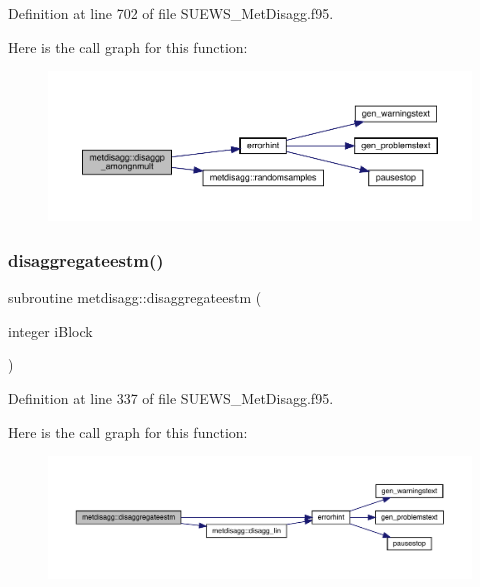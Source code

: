 Definition at line 702 of file S\+U\+E\+W\+S\+\_\+\+Met\+Disagg.\+f95.

Here is the call graph for this function\+:\nopagebreak
\begin{figure}[H]
\begin{center}
\leavevmode
\includegraphics[width=350pt]{namespacemetdisagg_aba0eed0257bc8f0ce67fac76eae7375b_cgraph}
\end{center}
\end{figure}
\mbox{\label{namespacemetdisagg_a67b638fd95044f06d411c6866ea8b2be}} 
\subsubsection{\texorpdfstring{disaggregateestm()}{disaggregateestm()}}
{\footnotesize\ttfamily subroutine metdisagg\+::disaggregateestm (\begin{DoxyParamCaption}\item[{integer}]{i\+Block }\end{DoxyParamCaption})}



Definition at line 337 of file S\+U\+E\+W\+S\+\_\+\+Met\+Disagg.\+f95.

Here is the call graph for this function\+:\nopagebreak
\begin{figure}[H]
\begin{center}
\leavevmode
\includegraphics[width=350pt]{namespacemetdisagg_a67b638fd95044f06d411c6866ea8b2be_cgraph}
\end{center}
\end{figure}
\mbox{\label{namespacemetdisagg_a9b4db8548b33c73cf14f7280cb8de1b6}} 
